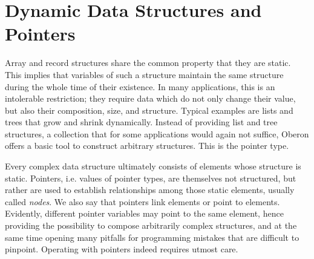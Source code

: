 \chapter{Dynamic Data Structures and Pointers}
\label{ch:ptr}
Array and record structures share the common property that they are static. This implies
that variables of such a structure maintain the same structure during the whole time of
their existence.  In many applications, this is an intolerable restriction; they require
data which do not only change their value, but also their composition, size, and structure.
Typical examples are lists and trees that grow and shrink dynamically. Instead of providing
list and tree structures, a collection that for some applications would again not suffice,
Oberon offers a basic tool to construct arbitrary structures.  This is the pointer type.

Every complex data structure ultimately consists of elements whose structure is static.
Pointers, i.e. values of pointer types, are themselves not structured, but rather are used
to establish relationships among those static elements, usually called \emph{nodes}. We
also say that pointers link elements or point to elements. Evidently, different pointer
variables may point to the same element, hence providing the possibility to compose
arbitrarily complex structures, and at the same time opening many pitfalls for programming
mistakes that are difficult to pinpoint. Operating with pointers indeed requires utmost care.


